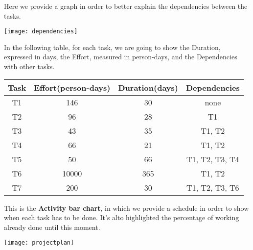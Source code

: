 \pagebreak
Here we provide a graph in order to better explain the dependencies between the tasks.
\begin{center}
	\texttt{[image: dependencies]}
\end{center}

In the following table, for each task, we are going to show the Duration, expressed in days, the Effort, measured in person-days, and the Dependencies with other tasks.
\begin{center}
	\begin{tabular}{c c c c}
		\hline
		\textbf{Task} & \textbf{Effort(person-days)} & \textbf{Duration(days)} & \textbf{Dependencies} \\
		\hline
		T1 & 146 & 30 & none \\
		T2 & 96 & 28 & T1 \\
		T3 & 43 & 35 & T1, T2 \\
		T4 & 66 & 21 & T1, T2 \\
		T5 & 50 & 66 & T1, T2, T3, T4 \\
		T6 & 10000 & 365 & T1, T2 \\
		T7 & 200 & 30 & T1, T2, T3, T6  \\
		\hline
	\end{tabular}
\end{center}

This is the \textbf{Activity bar chart}, in which we provide a schedule in order to show when each task has to be done. It's alto highlighted the percentage of working already done until this moment.  
\begin{center}
	\texttt{[image: projectplan]}
\end{center}

